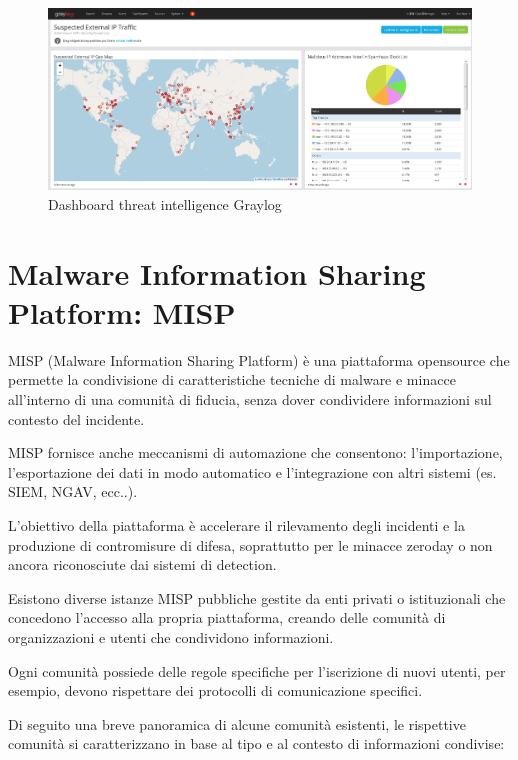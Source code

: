 \begin{figure}[h]
            \begin{center}
                \includegraphics[width=0.98\columnwidth]{images/4_caso_d'uso_img/dashboardGL.png}
            \end{center}
            \caption{Dashboard threat intelligence Graylog}
            \label{fig:Dashboard threat intelligence Graylog}
    \end{figure}
    
\newpage
    
\section{Malware Information Sharing Platform: MISP}
    
MISP (Malware Information Sharing Platform) è una piattaforma opensource che permette la condivisione di caratteristiche tecniche di malware e minacce all'interno di una comunità di fiducia, senza dover condividere informazioni sul contesto del incidente.\par
MISP fornisce anche meccanismi di automazione che consentono: l'importazione, l'esportazione dei dati in modo automatico e l'integrazione con altri sistemi (es. SIEM, NGAV, ecc..).\par
L'obiettivo della piattaforma è accelerare il rilevamento degli incidenti e la produzione di contromisure di difesa, soprattutto per le minacce zeroday o non ancora riconosciute dai sistemi di detection.\par
Esistono diverse istanze MISP pubbliche gestite da enti privati o istituzionali che concedono l’accesso alla propria piattaforma, creando delle comunità di organizzazioni e utenti che condividono informazioni.\par
Ogni comunità possiede delle regole specifiche per l’iscrizione di nuovi utenti, per esempio, devono rispettare dei protocolli di comunicazione specifici.\par
Di seguito una breve panoramica di alcune comunità esistenti, le rispettive comunità si caratterizzano in base al tipo e al contesto di informazioni condivise:

